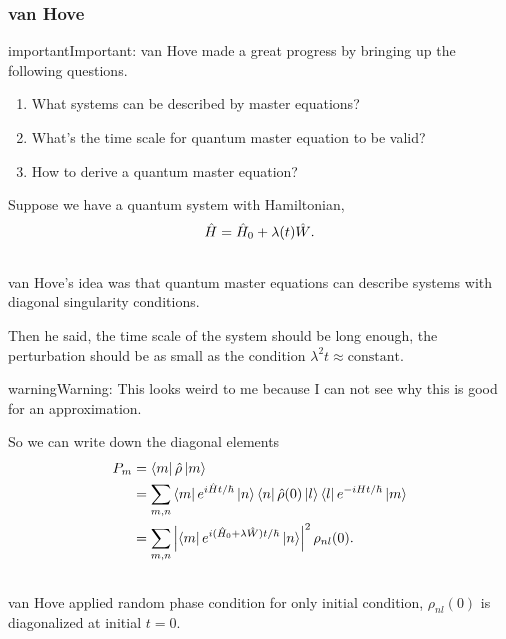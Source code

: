 \documentclass[letterpaper,10pt,english]{sphinxmanual}
\newcommand{\bra}[1]{\left\langle #1\right|}
\newcommand{\ket}[1]{\left| #1\right\rangle}
\begin{document}
\subsubsection{van Hove}
\label{nonequilibrium/quantumMasterEqn:van-hove}
\begin{notice}{important}{Important:}
van Hove made a great progress by bringing up the following questions.
\begin{enumerate}
\item {} 
What systems can be described by master equations?

\item {} 
What's the time scale for quantum master equation to be valid?

\item {} 
How to derive a quantum master equation?

\end{enumerate}
\end{notice}

Suppose we have a quantum system with Hamiltonian,
\begin{gather}
\begin{split}\hat H = \hat H_0 + \lambda(t)\hat W .\end{split}\notag\\\begin{split}\end{split}\notag
\end{gather}
van Hove's idea was that quantum master equations can describe systems with diagonal singularity conditions.

Then he said, the time scale of the system should be long enough, the perturbation should be as small as the condition $\lambda^2 t \approx \text{constant}$.

\begin{notice}{warning}{Warning:}
This looks weird to me because I can not see why this is good for an approximation.
\end{notice}

So we can write down the diagonal elements
\begin{gather}
\begin{split}P_m & = \bra{m}\hat \rho \ket{m} \\
& = \sum_{m,n} \bra{m} e^{i\hat H t/\hbar} \ket{n}\bra{n} \hat \rho(0) \ket{l}\bra{l} e^{-iHt/\hbar} \ket{m} \\
& = \sum_{m,n} \left\vert \bra{m} e^{i (\hat H_0 + \lambda \hat W) t/\hbar } \ket{n} \right\vert^2 \rho_{nl}(0) .\end{split}\notag\\\begin{split}\end{split}\notag
\end{gather}
van Hove applied random phase condition for only initial condition, $\rho_{nl}(0)$ is diagonalized at initial $t=0$.
\end{document}
